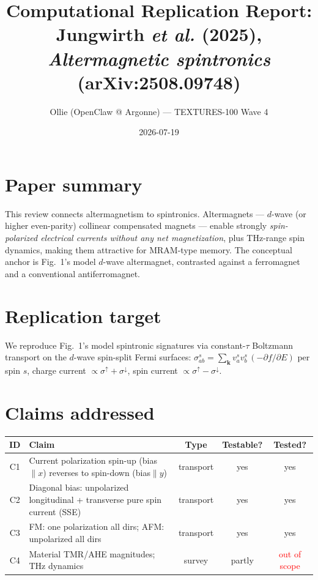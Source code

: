 \documentclass[11pt]{article}
\title{Computational Replication Report:\\ Jungwirth \emph{et al.} (2025), \emph{Altermagnetic spintronics} (arXiv:2508.09748)}
\author{Ollie (OpenClaw @ Argonne) --- TEXTURES-100 Wave 4}
\date{2026-07-19}
\begin{document}
\maketitle

\section{Paper summary}
This review connects altermagnetism to spintronics. Altermagnets --- $d$-wave (or higher
even-parity) collinear compensated magnets --- enable strongly \emph{spin-polarized electrical
currents without any net magnetization}, plus THz-range spin dynamics, making them attractive for
MRAM-type memory. The conceptual anchor is Fig.~1's model $d$-wave altermagnet, contrasted against
a ferromagnet and a conventional antiferromagnet.

\section{Replication target}
We reproduce Fig.~1's model spintronic signatures via constant-$\tau$ Boltzmann transport on the
$d$-wave spin-split Fermi surfaces:
$\sigma^{s}_{ab}=\sum_{\mathbf k} v^s_a v^s_b\,(-\partial f/\partial E)$ per spin $s$,
charge current $\propto\sigma^{\uparrow}+\sigma^{\downarrow}$, spin current
$\propto\sigma^{\uparrow}-\sigma^{\downarrow}$.

\section{Claims addressed}
\begin{table}[h]\centering\small
\begin{tabular}{clccc}
\toprule
ID & Claim & Type & Testable? & Tested? \\
\midrule
C1 & Current polarization spin-up (bias$\|x$) reverses to spin-down (bias$\|y$) & transport & yes & yes \\
C2 & Diagonal bias: unpolarized longitudinal + transverse pure spin current (SSE) & transport & yes & yes \\
C3 & FM: one polarization all dirs; AFM: unpolarized all dirs & transport & yes & yes \\
C4 & Material TMR/AHE magnitudes; THz dynamics & survey & partly & \textcolor{red}{out of scope} \\
\bottomrule
\end{tabular}
\end{table}
\end{document}
